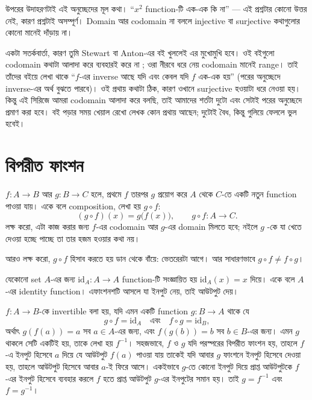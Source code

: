 \documentclass[11pt]{article}
\begin{document}
\begin{remark}
উপরের উদাহরণটাই এই অনুচ্ছেদের মূল কথা। ``$x^2$ function-টি এক-এক কি না''
--- এই প্রশ্নটার কোনো উত্তর নেই, কারণ প্রশ্নটাই অসম্পূর্ণ। Domain আর codomain
না বললে injective বা surjective কথাগুলোর কোনো মানেই দাঁড়ায় না।

একটা সতর্কবার্তা, কারণ তুমি Stewart বা Anton-এর বই খুললেই এর মুখোমুখি হবে। ওই বইগুলো
codomain কথাটা আলাদা করে ব্যবহারই করে না ; ওরা নীরবে ধরে নেয় codomain মানেই
range। তাই তাঁদের বইয়ে লেখা থাকে ``$f$-এর inverse আছে যদি এবং কেবল যদি $f$
এক-এক হয়'' (পরের অনুচ্ছেদে inverse-এর অর্থ বুঝতে পারবে)। ওই প্রথায় কথাটা ঠিক, কারণ ওখানে surjective হওয়াটা ধরে নেওয়া হয়। কিন্তু এই সিরিজে আমরা codomain আলাদা করে বলছি, তাই আমাদের শর্তটা
দুটো এবং সেটাই পরের অনুচ্ছেদে প্রমাণ করা হবে। বই পড়ার সময় খেয়াল রেখো
লেখক কোন প্রথায় আছেন; দুটোই বৈধ, কিন্তু গুলিয়ে ফেললে ভুল হবেই।
\end{remark}

\section{বিপরীত ফাংশন}

\begin{idea}[কম্পোজিশন]
$f \colon A \to B$ আর $g \colon B \to C$ হলে, প্রথমে $f$ তারপর $g$ প্রয়োগ করে
$A$ থেকে $C$-তে একটি নতুন function পাওয়া যায়। একে বলে composition, লেখা হয়
$g \circ f$:
\[
  (g \circ f)(x) = g\big(f(x)\big), \qquad g \circ f \colon A \to C .
\]
লক্ষ করো, এটা কাজ করার জন্য $f$-এর codomain আর $g$-এর domain মিলতে হবে;
নইলে $g$ -কে যা খেতে দেওয়া হচ্ছে পাচ্ছে তা তার হজম হওয়ার কথা নয়।

আরও লক্ষ করো, $g \circ f$ হিসাব করতে হয় ডান থেকে বাঁয়ে: ভেতরেরটা আগে। আর
সাধারণভাবে $g \circ f \neq f \circ g$।
\end{idea}

\begin{idea}[অভেদ ফাংশন]
যেকোনো set $A$-এর জন্য $\mathrm{id}_A \colon A \to A$ function-টি সংজ্ঞায়িত হয়
$\mathrm{id}_A(x) = x$ দিয়ে। একে বলে $A$-এর identity function। এফাংশনশটি আসলে যা ইনপুট নেয়, তাই আউটপুট দেয়।
\end{idea}

\begin{idea}
$f \colon A \to B$-কে invertible বলা হয়, যদি এমন একটি function
$g \colon B \to A$ থাকে যে
\[
  g \circ f = \mathrm{id}_A \quad \text{এবং} \quad f \circ g = \mathrm{id}_B ,
\]
অর্থাৎ $g(f(a)) = a$ সব $a \in A$-এর জন্য, এবং $f(g(b)) = b$ সব $b \in B$-এর
জন্য। এমন $g$ থাকলে সেটি একটিই হয়, তাকে লেখা হয় $f^{-1}$। সহজভাবে,  $f$ ও $g$ যদি পরস্পরের বিপরীত ফাংশন হয়, তাহলে $f$-এ ইনপুট হিসেবে $a$ দিয়ে যে আউটপুট $f(a)$ পাওয়া যায় তাকেই যদি আবার $g$ ফাংশনে ইনপুট হিসেবে দেওয়া হয়, তাহলে আউটপুট হিসেবে আবার $a$-ই ফিরে আসে। একইভাবে $g$-তে কোনো ইনপুট দিয়ে প্রাপ্ত আউটপুটকে $f$-এর ইনপুট হিসেবে ব্যবহার করলে $f$ হতে প্রাপ্ত আউটপুট $g$-এর ইনপুটের সমান হয়। তাই $g=f^{-1}$ এবং $f=g^{-1}$।
\end{idea}
\end{document}
